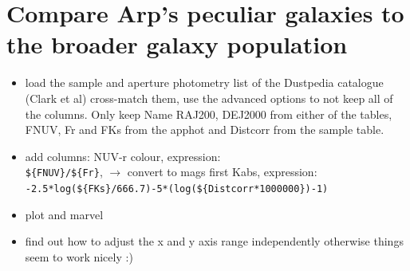 \documentclass [a4paper, 12pt]{article}
\begin{document}
\section{Compare Arp's peculiar galaxies to the broader galaxy population}

\begin{itemize}
	\item load the sample and aperture photometry list of the Dustpedia 
	catalogue (Clark et al) cross-match them, use the advanced options to not 
	keep all of the columns. Only keep Name RAJ200, DEJ2000 from either of the 
	tables, FNUV, Fr and FKs from the apphot and Distcorr from the sample 
	table. 
	\item add columns: NUV-r colour, expression: \\
	 \texttt{\$\{FNUV\}/\$\{Fr\}}, $\rightarrow$ convert to mags first
	Kabs, expression: \\
	\texttt{-2.5*log(\$\{FKs\}/666.7)-5*(log(\$\{Distcorr*1000000\})-1)}
	\item plot and marvel
	\item find out how to adjust the x and y axis range independently otherwise 
	things seem to work nicely :) 
	
\end{itemize}
\end{document}
